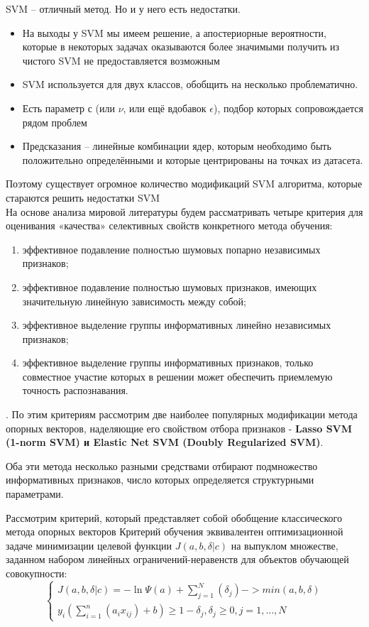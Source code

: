 \documentclass[../body.tex]{subfiles}
\begin{document}
	\vspace{\baselineskip}
	SVM – отличный метод. Но и у него есть недостатки.
	\begin{itemize}
		\item  На выходы у SVM мы имеем решение, а апостериорные вероятности, которые в некоторых задачах оказываются более значимыми получить из чистого SVM не предоставляется возможным
		\item  SVM используется для двух классов, обобщить на несколько
		проблематично.
		\item Есть параметр $с$ (или $\nu$, или ещё вдобавок $\epsilon$), подбор которых сопровождается рядом проблем
		\item Предсказания – линейные комбинации ядер, которым
		необходимо быть положительно определёнными и которые
		центрированы на точках из датасета.
	\end{itemize}
	Поэтому существует огромное количество модификаций SVM алгоритма, которые стараются решить недостатки SVM 
	\\
	
	На основе анализа мировой литературы будем рассматривать четыре критерия для
	оценивания «качества» селективных свойств конкретного метода обучения:
	\begin{enumerate}
		\item эффективное подавление полностью шумовых попарно независимых признаков;
		\item эффективное подавление полностью шумовых признаков, имеющих значительную
		линейную зависимость между собой;
		\item  эффективное выделение группы информативных линейно независимых признаков;
		\item эффективное выделение группы информативных признаков, только совместное участие которых в решении может обеспечить приемлемую точность распознавания.
	\end{enumerate}.
	По этим критериям рассмотрим две наиболее популярных модификации метода опорных векторов, наделяющие его свойством отбора признаков - \textbf{Lasso SVM
		(1-norm SVM) и Elastic Net SVM (Doubly Regularized SVM)}.
	
	\vspace{\baselineskip}
	Оба эти метода несколько разными средствами отбирают подмножество информативных признаков, число которых определяется структурными параметрами.
	
	
	Рассмотрим критерий, который представляет собой обобщение классического метода опорных векторов
	Критерий обучения эквивалентен оптимизационной задаче минимизации целевой функции $J(a, b, \delta |c)$ на выпуклом множестве, заданном набором линейных ограничений-неравенств для объектов обучающей совокупности: 
	$$\left\{\begin{matrix}
		J(a, b, \delta |c) = -\ln{\varPsi(a)}+ \sum_{j=1}^{N}(\delta_j)->min(a,b,\delta)
		\\
		y_i(\sum_{i=1}^{n}(a_ix_{ij})+b)\geq1-\delta_j, \delta_j \geq 0, j= 1,...,N
	\end{matrix}\right.$$
	
\end{document}
